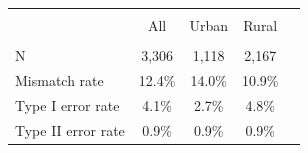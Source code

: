\scriptsize{
\begin{tabular}{lcccc}
\hline\hline \\[-8pt]
\rowcolor{yellow!15} & All & Urban & Rural \\
\hline \\[-8pt]
N & 3,306 & 1,118 & 2,167 \\
Mismatch rate & 12.4\% & 14.0\% & 10.9\% \\
Type I error rate & 4.1\% & 2.7\% & 4.8\% \\
Type II error rate & 0.9\% & 0.9\% & 0.9\% \\
\hline\hline
\end{tabular}}